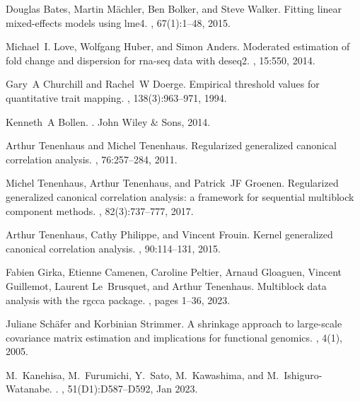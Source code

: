 \documentclass[
]{article}
\begin{document}
\begin{thebibliography}{100}
Douglas Bates, Martin M{\"a}chler, Ben Bolker, and Steve Walker.
\newblock Fitting linear mixed-effects models using {lme4}.
, 67(1):1--48, 2015.

Michael~I. Love, Wolfgang Huber, and Simon Anders.
\newblock Moderated estimation of fold change and dispersion for rna-seq data
  with deseq2.
, 15:550, 2014.

Gary~A Churchill and Rachel~W Doerge.
\newblock Empirical threshold values for quantitative trait mapping.
, 138(3):963--971, 1994.

Kenneth~A Bollen.
.
\newblock John Wiley \& Sons, 2014.

Arthur Tenenhaus and Michel Tenenhaus.
\newblock Regularized generalized canonical correlation analysis.
, 76:257--284, 2011.

Michel Tenenhaus, Arthur Tenenhaus, and Patrick~JF Groenen.
\newblock Regularized generalized canonical correlation analysis: a framework
  for sequential multiblock component methods.
, 82(3):737--777, 2017.

Arthur Tenenhaus, Cathy Philippe, and Vincent Frouin.
\newblock Kernel generalized canonical correlation analysis.
, 90:114--131, 2015.

Fabien Girka, Etienne Camenen, Caroline Peltier, Arnaud Gloaguen, Vincent
  Guillemot, Laurent Le~Brusquet, and Arthur Tenenhaus.
\newblock Multiblock data analysis with the rgcca package.
, pages 1--36, 2023.

Juliane Sch{\"a}fer and Korbinian Strimmer.
\newblock A shrinkage approach to large-scale covariance matrix estimation and
  implications for functional genomics.
,
  4(1), 2005.

M.~Kanehisa, M.~Furumichi, Y.~Sato, M.~Kawashima, and M.~Ishiguro-Watanabe.
.
, 51(D1):D587--D592, Jan 2023.


\end{thebibliography}
\end{document}
